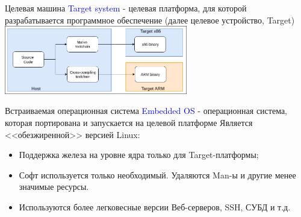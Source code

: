 \begin{frame}[fragile]{Целевая машина}
\textcolor{blue}{Target system} - целевая платформа, для которой разрабатывается программное обеспечение (далее целевое устройство, Target)
 \includegraphics[width=8cm]{intro_host_target003.png}
\end{frame}

\begin{frame}[fragile]{Встраиваемая операционная система}
\textcolor{blue}{Embedded OS} - операционная система, которая портирована и запускается на целевой платформе 
\linebreak
Является <<обезжиренной>> версией Linux:
\begin{itemize}
\item Поддержка железа на уровне ядра только для Target-платформы;
\item Софт используется только необходимый. Удаляются Man-ы и другие менее значимые ресурсы.
\item Используются более легковесные версии Веб-серверов, SSH, СУБД и т.д.
\end{itemize}

\end{frame}

